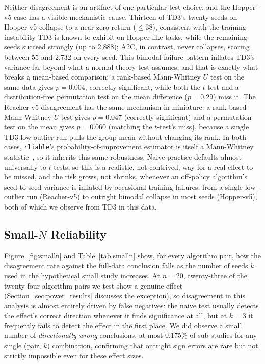 \documentclass[journal]{IEEEtran}
\begin{document}
Neither disagreement is an artifact of one particular test choice, and the Hopper-v5 case has a
visible mechanistic cause. Thirteen of TD3's twenty seeds on Hopper-v5 collapse to a near-zero
return ($\le 38$), consistent with the training instability TD3 is known to exhibit on
Hopper-like tasks, while the remaining seeds succeed strongly (up to 2{,}888); A2C, in contrast,
never collapses, scoring between 55 and 2{,}732 on every seed. This bimodal failure pattern
inflates TD3's variance far beyond what a normal-theory test assumes, and that is exactly what
breaks a mean-based comparison: a rank-based Mann-Whitney $U$ test on the same data gives
$p=0.004$, correctly significant, while both the $t$-test and a distribution-free permutation test
on the mean difference ($p=0.29$) miss it. The Reacher-v5 disagreement has the same mechanism in
miniature: a rank-based Mann-Whitney $U$ test gives $p=0.047$ (correctly significant) and a
permutation test on the mean gives $p=0.060$ (matching the $t$-test's miss), because a single TD3
low-outlier run pulls the group mean without changing its rank. In both cases,
\texttt{rliable}'s probability-of-improvement estimator is itself a Mann-Whitney
statistic~\cite{agarwal2021deep}, so it inherits this same robustness. Naive practice defaults
almost universally to $t$-tests, so this is a realistic, not contrived, way for a real effect to
be missed, and the risk grows, not shrinks, whenever an off-policy algorithm's seed-to-seed
variance is inflated by occasional training failures, from a single low-outlier run (Reacher-v5)
to outright bimodal collapse in most seeds (Hopper-v5), both of which we observe from TD3 in this
data.



\subsection{Small-$N$ Reliability}

Figure~\ref{fig:smalln} and Table~\ref{tab:smalln} show, for every algorithm pair, how the
disagreement rate against the full-data conclusion falls as the number of seeds $k$ used in the
hypothetical small study increases. At $n=20$, twenty-three of the twenty-four algorithm pairs we
test show a genuine effect (Section~\ref{sec:power_results} discusses the exception), so
disagreement in this analysis is almost entirely driven by false negatives: the naive test usually
detects the effect's correct direction whenever it finds significance at all, but at $k=3$ it
frequently fails to detect the effect in the first place. We did observe a small number of
\emph{directionally wrong} conclusions, at most 0.175\% of sub-studies for any single (pair, $k$)
combination, confirming that outright sign errors are rare but not strictly impossible even for
these effect sizes.
\end{document}
